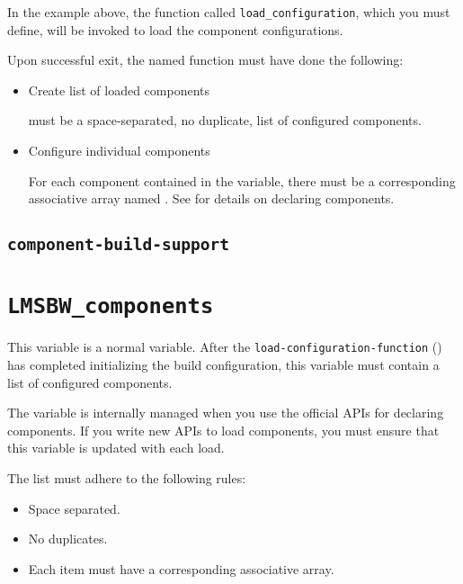 In the example above, the function called
\texttt{load\_configuration}, which you must define, will be invoked
to load the component configurations.

Upon successful exit, the named function must have done the following:

\begin{itemize}
\item Create list of loaded components

  \lmsbwcomponents must be a space-separated, no duplicate, list of
  configured components.

\item Configure individual components

  For each component contained in the \lmsbwcomponents variable, there
  must be a corresponding associative array named
  .  See  for details
  on declaring components.

\end{itemize}

\subsection{\texttt{component-build-support}}\label{variables:component-build-support}


\section{\texttt{LMSBW\_components}}

This variable is a normal \make variable.  After the
\texttt{load-configuration-function}
() has completed initializing the
build configuration, this variable must contain a list of configured
components.

The variable is internally managed when you use the official APIs for
declaring components.  If you write new APIs to load components, you
must ensure that this variable is updated with each load.

The list must adhere to the following rules:

\begin{itemize}
\item Space separated.
\item No duplicates.
\item Each item must have a corresponding 
  associative array.
\end{itemize}

